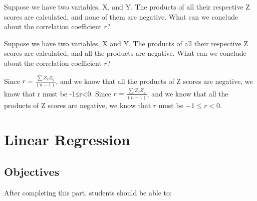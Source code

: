 \documentclass[11pt, chapterprefix=true]{scrbook}\usepackage[]{graphicx}\usepackage[]{color}
\begin{document}
\begin{exercises}
\begin{solution}
\end{solution}

\begin{exercise} %

Suppose we have two variables, X, and Y. The products of all their respective Z scores are calculated, and none of them are negative. What can we conclude about the correlation coefficient $r$?
\end{exercise}
\begin{solution} %

\end{solution}

\begin{exercise} %

Suppose we have two variables, X and Y. The products of all their respective Z scores are calculated, and all the products are negative. What can we conclude about the correlation coefficient $r$?
\end{exercise}
\begin{solution} %

Since $ r = \frac{ \sum Z_x Z_y}{(n - 1)}$, and we know that all the products of Z scores are negative, we know that r must be -1≤r<0. Since $ r = \frac{ \sum Z_x Z_y}{(n - 1)}$, and we know that all the products of Z scores are negative, we know that $r$ must be $-1 \le r < 0$.
\end{solution}
\end{exercises}

\onecolumn



\chapter{Linear Regression}
\label{chap:ch16}

\section{Objectives}

After completing this part, students should be able to:

\end{document}

